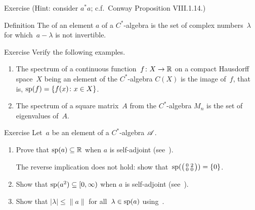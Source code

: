 \documentclass[a]{subfiles}
\begin{document}
\begin{parsec}
\begin{point}{Exercise}
(Hint: consider $a^*a$; c.f.~Conway Proposition VIII.1.14.)
\end{point}
\begin{point}{Definition}%
The  of an element $a$
of a $C^*$-algebra
is the set 
of complex numbers~$\lambda$
for which~$a-\lambda$ is not invertible.
\end{point}
\begin{point}{Exercise}%
Verify the following examples.
\begin{enumerate}
\item
The spectrum of a continuous function~$f\colon X\to \mathbb{R}$
on a compact Hausdorff space~$X$
being an element of the $C^*$-algebra $C(X)$
is the image of~$f$, that is,
$\mathrm{sp}(f) = \{f(x)\colon x\in X\}$.
\item
The spectrum of a square matrix~$A$
from the $C^*$-algebra $M_n$
is the set of eigenvalues of~$A$.
\end{enumerate}
\end{point}
\begin{point}{Exercise}%
Let~$a$ be an element of a $C^*$-algebra $\mathscr{A}$.
\begin{enumerate}
\item
Prove that $\mathrm{sp}(a)\subseteq \mathbb{R}$ when $a$ is self-adjoint
(see~).

The reverse implication does not hold:
show that~$\mathrm{sp}(\bigl(
\begin{smallmatrix}0&2\\0&0\end{smallmatrix}\bigr))=\{0\}$.

\item
Show that $\mathrm{sp}(a^2)\subseteq [0,\infty)$ when $a$ is self-adjoint
(see~).

\item
Show that $|\lambda|\leq \|a\|$ for all~$\lambda\in\mathrm{sp}(a)$
using~.


\end{enumerate}
\end{point}
\end{parsec}
\end{document}
